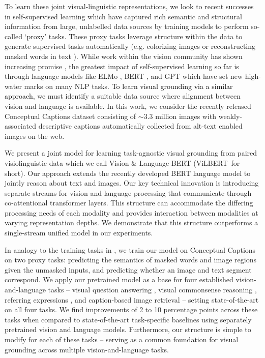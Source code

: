 To learn these joint visual-linguistic representations, we look to recent successes in self-supervised learning which have captured rich semantic and structural information from large, unlabelled data sources by training models to perform so-called `proxy' tasks. These proxy tasks leverage structure within the data to generate supervised tasks automatically (e.g. colorizing images \cite{larsson2017colorization} or reconstructing masked words in text \cite{devlin2018bert}). While work within the vision community has shown increasing promise \cite{jayaraman2018shapecodes,arandjelovic2017look,pathak2017learning}, the greatest impact of self-supervised learning so far is through language models like ELMo \cite{peters2018elmo}, BERT \cite{devlin2018bert}, and GPT \cite{radford2018improving} which have set new high-water marks on many NLP tasks. \textcolor{Black}{To learn visual grounding via a similar approach,} we must identify a suitable data source where alignment between vision and language is available. In this work, we consider the recently released Conceptual Captions \cite{sharma2018conceptual} dataset consisting of $\sim$3.3 million images with weakly-associated descriptive captions automatically collected from alt-text enabled images on the web.

We present a joint model for learning task-agnostic visual grounding from paired visiolinguistic data which we call Vision \& Language BERT (ViLBERT~for short). Our approach extends the recently developed BERT \cite{devlin2018bert} language model to jointly reason about text and images. Our key technical innovation is introducing separate streams for vision and language processing that communicate through  co-attentional transformer layers. This structure can accommodate the differing processing needs of each modality and provides interaction between modalities at varying representation depths.  We demonstrate that this structure outperforms a single-stream unified model in our experiments.

In analogy to the training tasks in \cite{devlin2018bert}, we train our model on Conceptual Captions on two proxy tasks: predicting the semantics of masked words and image regions given the unmasked inputs, and predicting whether an image and text segment correspond. We apply our pretrained model as a base for four established vision-and-language tasks -- visual question answering \cite{vqa}, visual commonsense reasoning \cite{zellers2018vcr}, referring expressions \cite{referit}, and caption-based image retrieval \cite{young2014image}  -- setting state-of-the-art on all four tasks. We find improvements of 2 to 10 percentage points across these tasks when compared to state-of-the-art task-specific baselines using separately pretrained vision and language models. Furthermore, our structure is simple to modify for each of these tasks -- serving as a common foundation for visual grounding across multiple vision-and-language tasks.

